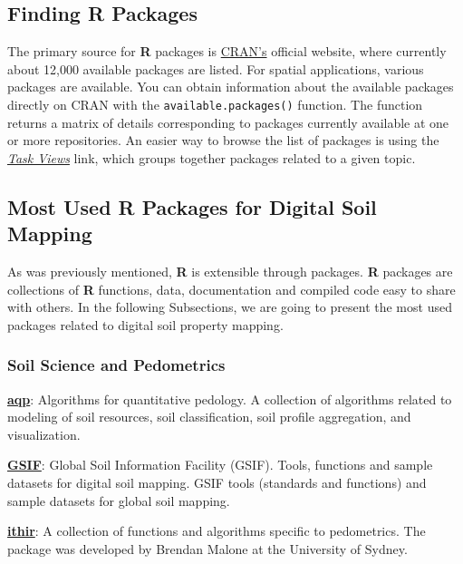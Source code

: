 \documentclass[10pt,b5paper,]{book}
\theoremstyle{definition}
\theoremstyle{definition}
\theoremstyle{definition}
\theoremstyle{remark}
\begin{document}
\hypertarget{finding-r-packages}{%
\subsection{Finding R Packages}\label{finding-r-packages}}

The primary source for \textbf{R} packages is
\href{https://cran.r-project.org/}{CRAN's} official website, where
currently about 12,000 available packages are listed. For spatial
applications, various packages are available. You can obtain information
about the available packages directly on CRAN with the
\texttt{available.packages()} function. The function returns a matrix of
details corresponding to packages currently available at one or more
repositories. An easier way to browse the list of packages is using the
\href{https://cran.r-project.org/web/views/}{\emph{Task Views}} link,
which groups together packages related to a given topic.

\hypertarget{most-used-r-packages-for-digital-soil-mapping}{%
\subsection{Most Used R Packages for Digital Soil
Mapping}\label{most-used-r-packages-for-digital-soil-mapping}}

As was previously mentioned, \textbf{R} is extensible through packages.
\textbf{R} packages are collections of \textbf{R} functions, data,
documentation and compiled code easy to share with others. In the
following Subsections, we are going to present the most used packages
related to digital soil property mapping.

\hypertarget{SoilPedometrics}{%
\subsubsection{Soil Science and Pedometrics}\label{SoilPedometrics}}

\href{https://CRAN.R-project.org/package=aqp}{\textbf{aqp}}: Algorithms
for quantitative pedology. A collection of algorithms related to
modeling of soil resources, soil classification, soil profile
aggregation, and visualization.

\href{https://CRAN.R-project.org/package=GSIF}{\textbf{GSIF}}: Global
Soil Information Facility (GSIF). Tools, functions and sample datasets
for digital soil mapping. GSIF tools (standards and functions) and
sample datasets for global soil mapping.

\href{http://ithir.r-forge.r-project.org/}{\textbf{ithir}}: A collection
of functions and algorithms specific to pedometrics. The package was
developed by Brendan Malone at the University of Sydney.
\end{document}
